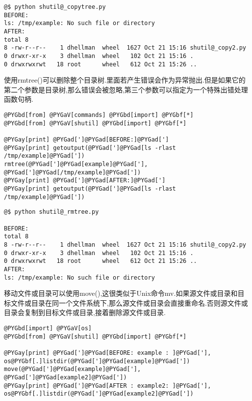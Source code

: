 \documentclass[letterpaper,10pt,english]{manual}
\begin{document}
\begin{Verbatim}[commandchars=@\[\]]
@$ python shutil@_copytree.py
BEFORE:
ls: /tmp/example: No such file or directory
AFTER:
total 8
8 -rw-r--r--    1 dhellman  wheel  1627 Oct 21 15:16 shutil@_copy2.py
0 drwxr-xr-x    3 dhellman  wheel   102 Oct 21 15:16 .
0 drwxrwxrwt   18 root      wheel   612 Oct 21 15:26 ..
\end{Verbatim}

使用rmtree()可以删除整个目录树.里面若产生错误会作为异常抛出.但是如果它的第二个参数是目录树,那么错误会被忽略,第三个参数可以指定为一个特殊出错处理函数句柄.

\begin{Verbatim}[commandchars=@\[\]]
@PYGbd[from] @PYGaV[commands] @PYGbd[import] @PYGbf[*]
@PYGbd[from] @PYGaV[shutil] @PYGbd[import] @PYGbf[*]

@PYGay[print] @PYGad[']@PYGad[BEFORE:]@PYGad[']
@PYGay[print] getoutput(@PYGad[']@PYGad[ls -rlast /tmp/example]@PYGad['])
rmtree(@PYGad[']@PYGad[example]@PYGad['], @PYGad[']@PYGad[/tmp/example]@PYGad['])
@PYGay[print] @PYGad[']@PYGad[AFTER:]@PYGad[']
@PYGay[print] getoutput(@PYGad[']@PYGad[ls -rlast /tmp/example]@PYGad['])
\end{Verbatim}

\begin{Verbatim}[commandchars=@\[\]]
@$ python shutil@_rmtree.py

BEFORE:
total 8
8 -rw-r--r--    1 dhellman  wheel  1627 Oct 21 15:16 shutil@_copy2.py
0 drwxr-xr-x    3 dhellman  wheel   102 Oct 21 15:16 .
0 drwxrwxrwt   18 root      wheel   612 Oct 21 15:26 ..
AFTER:
ls: /tmp/example: No such file or directory
\end{Verbatim}

移动文件或目录可以使用move(),这很类似于Unix命令mv.如果源文件或目录和目标文件或目录在同一个文件系统下,那么源文件或目录会直接重命名.否则源文件或目录会复制到目标文件或目录,接着删除源文件或目录.

\begin{Verbatim}[commandchars=@\[\]]
@PYGbd[import] @PYGaV[os]
@PYGbd[from] @PYGaV[shutil] @PYGbd[import] @PYGbf[*]

@PYGay[print] @PYGad[']@PYGad[BEFORE: example : ]@PYGad['], os@PYGbf[.]listdir(@PYGad[']@PYGad[example]@PYGad['])
move(@PYGad[']@PYGad[example]@PYGad['], @PYGad[']@PYGad[example2]@PYGad['])
@PYGay[print] @PYGad[']@PYGad[AFTER : example2: ]@PYGad['], os@PYGbf[.]listdir(@PYGad[']@PYGad[example2]@PYGad['])
\end{Verbatim}
\end{document}
